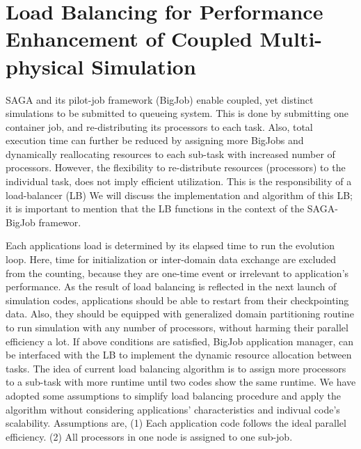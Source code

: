 \documentclass[conference,final]{IEEEtran}
\begin{document}
\section{Load Balancing for Performance Enhancement of Coupled Multi-physical Simulation}


SAGA and its pilot-job framework (BigJob) enable coupled, yet distinct simulations to be 
submitted to queueing system.  This is done by submitting one container job, and re-distributing its processors to each task.  Also, total execution time can further be reduced by assigning more BigJobs and dynamically reallocating resources to each sub-task with increased number of processors. 
However, the flexibility to re-distribute resources (processors) to the individual task, does
not imply efficient utilization. This is the responsibility of a load-balancer (LB)
We will discuss the implementation and algorithm of this LB; it is important
to mention that the LB functions in the context of the SAGA-BigJob framewor.


Each applications load is determined by its elapsed time to run the evolution loop. Here, time for initialization or inter-domain data exchange are excluded from the counting, because they are one-time event or irrelevant to application's performance. As the result of load balancing is reflected in the next launch of simulation codes, applications should be able to restart from their checkpointing data. Also, they should be equipped with generalized domain partitioning routine to run simulation with any number of processors, without harming their parallel efficiency a lot.  If above conditions are satisfied, BigJob application manager, 
can be interfaced with the LB to implement the dynamic resource allocation between tasks.
The idea of current load balancing algorithm is to assign more processors to a sub-task with more runtime until two codes show the same runtime. We have adopted some assumptions to simplify load balancing procedure and apply the algorithm without considering applications' characteristics and indivual code's scalability. Assumptions are, (1) Each application code follows the ideal parallel efficiency.
(2) All processors in one node is assigned to one sub-job.
\end{document}

